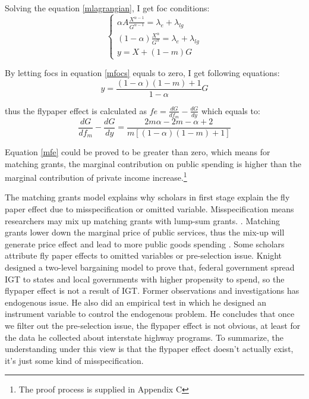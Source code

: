 Solving the equation \ref{mlagrangian}, I get foc conditions:
\begin{equation} \label{mfocs}
    \left\{\begin{array}{l}\alpha A \frac{X^{\alpha-1}}{G^{\alpha-1}}=\lambda_e+\lambda_{l g} \\ (1-\alpha) \frac{X^\alpha}{G^\alpha}=\lambda_e+\lambda_{l g} \\ y=X+(1-m) G\end{array}\right.
\end{equation}

By letting focs in equation \ref{mfocs} equals to zero, I get following equations:
\begin{equation} \label{myxandg}
    y=\frac{(1-\alpha)(1-m)+1}{1-\alpha} G
\end{equation}

thus the flypaper effect is calculated as $fe=\frac{d G}{d f_m}-\frac{d G}{d y}$
which equals to:
\begin{equation} \label{mfe}
    \frac{d G}{d f_m}-\frac{d G}{d y}=\frac{2 m \alpha-2 m-\alpha+2}{m[(1-\alpha)(1-m)+1]}
\end{equation}

Equation \ref{mfe} could be proved to be greater than zero, which means for matching grants, the marginal contribution on public spending is higher than the marginal contribution of private income increase.\footnote[1]{The proof process is supplied in Appendix C}

The matching grants model explains why scholars in first stage explain the fly paper effect due to misspecification or omitted variable. Misspecification means researchers may mix up matching grants with lump-sum grants. \cite{lankford1987note,henderson1968local}. Matching grants lower down the marginal price of public services, thus the mix-up will generate price effect and lead to more public goods spending \cite{gramlich1997state}. Some scholars attribute fly paper effects to omitted variables or pre-selection issue. Knight \cite{knight2002endogenous} designed a two-level bargaining model to prove that, federal government spread IGT to states and local governments with higher propensity to spend, so the flypaper effect is not a result of IGT. Former observations and investigations has endogenous issue. He also did an empirical test in which he designed an instrument variable to control the endogenous problem. He concludes that once we filter out the pre-selection issue, the flypaper effect is not obvious, at least for the data he collected about interstate highway programs. To summarize, the understanding under this view is that the flypaper effect doesn’t actually exist, it's just some kind of misspecification.

